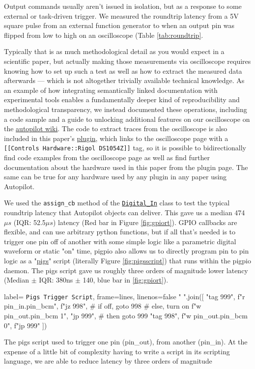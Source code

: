 Output commands usually aren't issued in isolation, but as a response to some external or task-driven trigger. We measured the roundtrip latency from a 5V square pulse from an external function generator to when an output pin was flipped from low to high on an oscilloscope (Table \ref{tab:roundtrip}. 

Typically that is as much methodological detail as you would expect in a scientific paper, but actually making those measurements via oscilloscope requires knowing how to set up such a test as well as how to extract the measured data afterwards --- which is not altogether trivially available technical knowledge. As an example of how integrating semantically linked documentation with experimental tools enables a fundamentally deeper kind of reproducibility and methodological transparency, we instead documented these operations, including a code sample and a guide to unlocking additional features on our oscilloscope on the \href{https://wiki.auto-pi-lot.com/index.php/Rigol\_DS1054Z}{autopilot wiki}. The code to extract traces from the oscilloscope is also included in this paper's \href{https://wiki.auto-pi-lot.com/index.php/Plugin:Autopilot\_Paper}{plugin}, which links to the oscilloscope page with a \texttt{[[Controls Hardware::Rigol DS1054Z]]} tag, so it is possible to bidirectionally find code examples from the oscilloscope page as well as find further documentation about the hardware used in this paper from the plugin page. The same can be true for any hardware used by any plugin in any paper using Autopilot.

We used the \texttt{assign\_cb} method of the \href{https://docs.auto-pi-lot.com/en/latest/hardware/gpio.html\#autopilot.hardware.gpio.Digital_In.assign_cb}{\texttt{Digital\_In}} class to test the typical roundtrip latency that Autopilot objects can deliver. This gave us a median 474 $\mu s$ (IQR: 52.5$\mu s$) latency (Red bar in Figure \ref{fig:gpiort}). GPIO callbacks are flexible, and can use arbitrary python functions, but if all that's needed is to trigger one pin off of another with some simple logic like a parametric digital waveform or static "on" time, pigpio also allows us to directly program pin to pin logic as a "\href{http://abyz.me.uk/rpi/pigpio/pigs.html}{pigs}" script (literally Figure \ref{fig:pigsscript}) that runs within the pigpio daemon. The pigs script gave us roughly three orders of magnitude lower latency (Median $\pm$ IQR: 380ns $\pm$ 140, blue bar in \ref{fig:gpiort}). 

\begin{marginfigure}[-7cm]
\begin{pythoncode*}{
label= \texttt{Pigs Trigger Script},
frame=lines,
linenos=false}
" ".join([
  "tag 999",
  f"r {pin_in.pin_bcm}",
  f"jz 998", # if off, goto 998
  # else, turn on
  f"w {pin_out.pin_bcm} 1",
  "jp 999", # then goto 999
  "tag 998",
  f"w {pin_out.pin_bcm} 0",
  f"jp 999"
])
\end{pythoncode*}
\caption{The pigs script used to trigger one pin (pin\_out), from another (pin\_in). At the expense of a little bit of complexity having to write a script in its scripting language, we are able to reduce latency by three orders of magnitude}
\label{fig:pigsscript}
\end{marginfigure}


